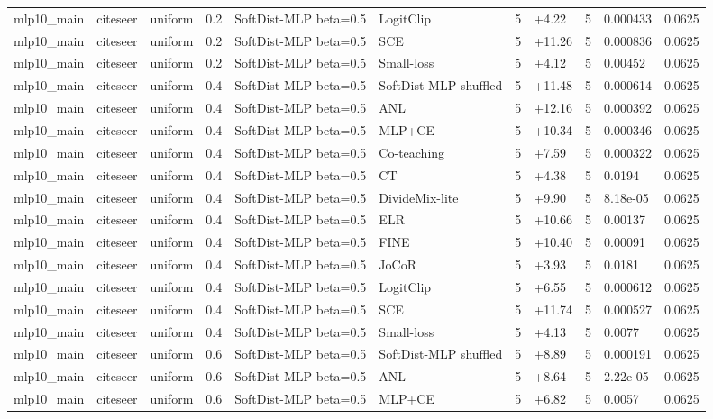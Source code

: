 \begin{table}[t]
\begin{tabular}{llllllrlrll}
mlp10_main & citeseer & uniform & 0.2 & SoftDist-MLP beta=0.5 & LogitClip & 5 & +4.22 & 5 & 0.000433 & 0.0625 \\
mlp10_main & citeseer & uniform & 0.2 & SoftDist-MLP beta=0.5 & SCE & 5 & +11.26 & 5 & 0.000836 & 0.0625 \\
mlp10_main & citeseer & uniform & 0.2 & SoftDist-MLP beta=0.5 & Small-loss & 5 & +4.12 & 5 & 0.00452 & 0.0625 \\
mlp10_main & citeseer & uniform & 0.4 & SoftDist-MLP beta=0.5 & SoftDist-MLP shuffled & 5 & +11.48 & 5 & 0.000614 & 0.0625 \\
mlp10_main & citeseer & uniform & 0.4 & SoftDist-MLP beta=0.5 & ANL & 5 & +12.16 & 5 & 0.000392 & 0.0625 \\
mlp10_main & citeseer & uniform & 0.4 & SoftDist-MLP beta=0.5 & MLP+CE & 5 & +10.34 & 5 & 0.000346 & 0.0625 \\
mlp10_main & citeseer & uniform & 0.4 & SoftDist-MLP beta=0.5 & Co-teaching & 5 & +7.59 & 5 & 0.000322 & 0.0625 \\
mlp10_main & citeseer & uniform & 0.4 & SoftDist-MLP beta=0.5 & CT & 5 & +4.38 & 5 & 0.0194 & 0.0625 \\
mlp10_main & citeseer & uniform & 0.4 & SoftDist-MLP beta=0.5 & DivideMix-lite & 5 & +9.90 & 5 & 8.18e-05 & 0.0625 \\
mlp10_main & citeseer & uniform & 0.4 & SoftDist-MLP beta=0.5 & ELR & 5 & +10.66 & 5 & 0.00137 & 0.0625 \\
mlp10_main & citeseer & uniform & 0.4 & SoftDist-MLP beta=0.5 & FINE & 5 & +10.40 & 5 & 0.00091 & 0.0625 \\
mlp10_main & citeseer & uniform & 0.4 & SoftDist-MLP beta=0.5 & JoCoR & 5 & +3.93 & 5 & 0.0181 & 0.0625 \\
mlp10_main & citeseer & uniform & 0.4 & SoftDist-MLP beta=0.5 & LogitClip & 5 & +6.55 & 5 & 0.000612 & 0.0625 \\
mlp10_main & citeseer & uniform & 0.4 & SoftDist-MLP beta=0.5 & SCE & 5 & +11.74 & 5 & 0.000527 & 0.0625 \\
mlp10_main & citeseer & uniform & 0.4 & SoftDist-MLP beta=0.5 & Small-loss & 5 & +4.13 & 5 & 0.0077 & 0.0625 \\
mlp10_main & citeseer & uniform & 0.6 & SoftDist-MLP beta=0.5 & SoftDist-MLP shuffled & 5 & +8.89 & 5 & 0.000191 & 0.0625 \\
mlp10_main & citeseer & uniform & 0.6 & SoftDist-MLP beta=0.5 & ANL & 5 & +8.64 & 5 & 2.22e-05 & 0.0625 \\
mlp10_main & citeseer & uniform & 0.6 & SoftDist-MLP beta=0.5 & MLP+CE & 5 & +6.82 & 5 & 0.0057 & 0.0625 \\

\end{tabular}
\end{table}

